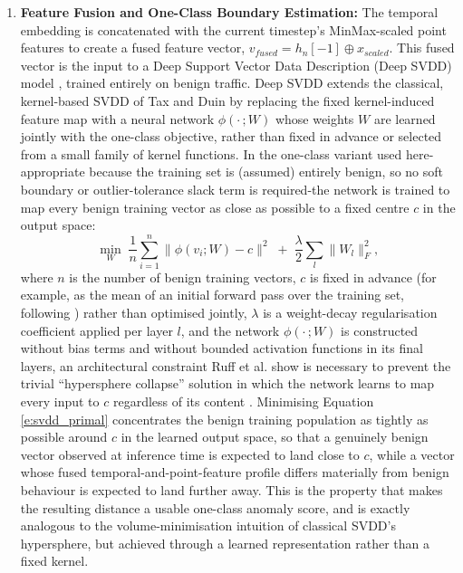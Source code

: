\begin{enumerate}
	\item \textbf{Feature Fusion and One-Class Boundary Estimation:} The temporal embedding is concatenated with the current timestep's MinMax-scaled point features to create a fused feature vector, $v_{fused} = h_n[-1] \oplus x_{scaled}$. This fused vector is the input to a Deep Support Vector Data Description (Deep SVDD) model \cite{Ruff2018}, trained entirely on benign traffic. Deep SVDD extends the classical, kernel-based SVDD of Tax and Duin \cite{Tax2004} by replacing the fixed kernel-induced feature map with a neural network $\phi(\cdot\,; W)$ whose weights $W$ are learned jointly with the one-class objective, rather than fixed in advance or selected from a small family of kernel functions. In the one-class variant used here-appropriate because the training set is (assumed) entirely benign, so no soft boundary or outlier-tolerance slack term is required-the network is trained to map every benign training vector as close as possible to a fixed centre $c$ in the output space:
	\begin{equation}
	\min_{W} \; \frac{1}{n} \sum_{i=1}^{n} \lVert \phi(v_i; W) - c \rVert^2 \; + \; \frac{\lambda}{2} \sum_{l} \lVert W_l \rVert_F^2,
	\label{e:svdd_primal}
	\end{equation}
	where $n$ is the number of benign training vectors, $c$ is fixed in advance (for example, as the mean of an initial forward pass over the training set, following \cite{Ruff2018}) rather than optimised jointly, $\lambda$ is a weight-decay regularisation coefficient applied per layer $l$, and the network $\phi(\cdot\,;W)$ is constructed without bias terms and without bounded activation functions in its final layers, an architectural constraint Ruff et al. show is necessary to prevent the trivial ``hypersphere collapse'' solution in which the network learns to map every input to $c$ regardless of its content \cite{Ruff2018}. Minimising Equation \ref{e:svdd_primal} concentrates the benign training population as tightly as possible around $c$ in the learned output space, so that a genuinely benign vector observed at inference time is expected to land close to $c$, while a vector whose fused temporal-and-point-feature profile differs materially from benign behaviour is expected to land further away. This is the property that makes the resulting distance a usable one-class anomaly score, and is exactly analogous to the volume-minimisation intuition of classical SVDD's hypersphere, but achieved through a learned representation rather than a fixed kernel.


\end{enumerate}
